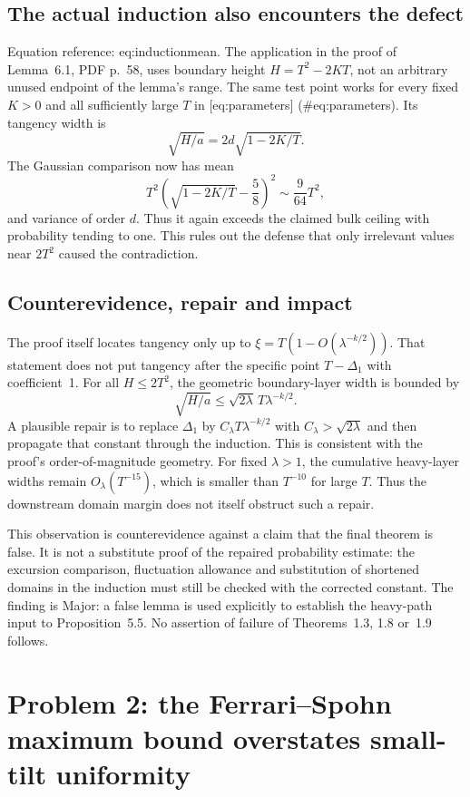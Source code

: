 \documentclass[10pt]{article}
\begin{document}
\subsection*{The actual induction also encounters the defect}
Equation reference: eq:inductionmean. The application in the proof of Lemma 6.1, PDF p. 58, uses boundary height \(H=T^2-2KT\), not an arbitrary unused endpoint of the lemma’s range. The same test point works for every fixed \(K>0\) and all sufficiently large \(T\) in [eq:parameters] (\#eq:parameters). Its tangency width is \[\sqrt{H/a}=2d\sqrt{1-2K/T}.\] The Gaussian comparison now has mean \[
 T^2\left(\sqrt{1-2K/T}-\frac58\right)^2
 \sim\frac9{64}T^2,\] and variance of order \(d\). Thus it again exceeds the claimed bulk ceiling with probability tending to one. This rules out the defense that only irrelevant values near \(2T^2\) caused the contradiction.\par
\subsection*{Counterevidence, repair and impact}
The proof itself locates tangency only up to \(\xi=T(1-O(\lambda^{-k/2}))\). That statement does not put tangency after the specific point \(T-\Delta_1\) with coefficient 1. For all \(H\leq2T^2\), the geometric boundary-layer width is bounded by \[\sqrt{H/a}\leq\sqrt{2\lambda}\,T\lambda^{-k/2}.\] A plausible repair is to replace \(\Delta_1\) by \(C_\lambda T\lambda^{-k/2}\) with \(C_\lambda>\sqrt{2\lambda}\) and then propagate that constant through the induction. This is consistent with the proof’s order-of-magnitude geometry. For fixed \(\lambda>1\), the cumulative heavy-layer widths remain \(O_\lambda(T^{-15})\), which is smaller than \(T^{-10}\) for large \(T\). Thus the downstream domain margin does not itself obstruct such a repair.\par
This observation is counterevidence against a claim that the final theorem is false. It is not a substitute proof of the repaired probability estimate: the excursion comparison, fluctuation allowance and substitution of shortened domains in the induction must still be checked with the corrected constant. The finding is Major: a false lemma is used explicitly to establish the heavy-path input to Proposition 5.5. No assertion of failure of Theorems 1.3, 1.8 or 1.9 follows.\par
\section*{Problem 2: the Ferrari–Spohn maximum bound overstates small-tilt uniformity}
\end{document}

